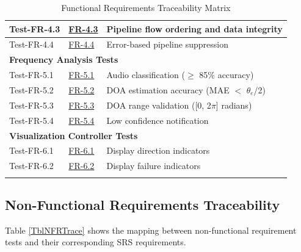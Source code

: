 \documentclass[12pt, titlepage]{article}
\begin{document}
{\begin{longtable}{|p{2.5cm}|p{3cm}|p{8cm}|}
\hline
Test-FR-4.3 & \hyperref[SRS-FR4_3]{FR-4.3} & Pipeline flow ordering and data
integrity \\
\hline
Test-FR-4.4 & \hyperref[SRS-FR4_4]{FR-4.4} & Error-based pipeline suppression \\
\hline
\hline
\multicolumn{3}{|l|}{\textbf{Frequency Analysis Tests}} \\
\hline
Test-FR-5.1 & \hyperref[SRS-FR5_1]{FR-5.1} & Audio classification ($\geq$ 85\%
accuracy) \\
\hline
Test-FR-5.2 & \hyperref[SRS-FR5_2]{FR-5.2} & DOA estimation accuracy (MAE $<$
$\theta_e$/2) \\
\hline
Test-FR-5.3 & \hyperref[SRS-FR5_3]{FR-5.3} & DOA range validation ([0, 2$\pi$]
radians) \\
\hline
Test-FR-5.4 & \hyperref[SRS-FR5_4]{FR-5.4} & Low confidence notification \\
\hline
\hline
\multicolumn{3}{|l|}{\textbf{Visualization Controller Tests}} \\
\hline
Test-FR-6.1 & \hyperref[SRS-FR6_1]{FR-6.1} & Display direction indicators \\
\hline
Test-FR-6.2 & \hyperref[SRS-FR6_2]{FR-6.2} & Display failure indicators \\
\hline
\caption{Functional Requirements Traceability Matrix}
\label{TblFRTrace}
\end{longtable}
}
\subsection{Non-Functional Requirements Traceability}

Table \ref{TblNFRTrace} shows the mapping between non-functional requirement
tests and their corresponding SRS requirements.
\end{document}
